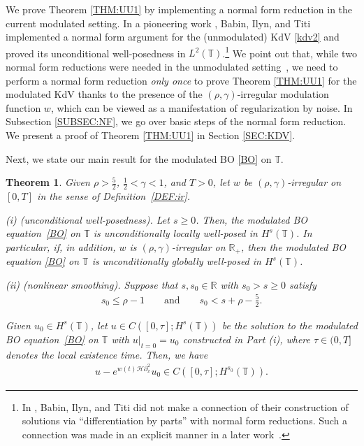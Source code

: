 \documentclass[letterpaper, 11pt,  reqno]{amsart}
\newtheorem{theorem}{Theorem} [section]
\newcommand{\1}{\hspace{0.5mm}\text{I}\hspace{0.5mm}}
\newcommand{\noi}{\noindent}
\newcommand{\R}{\mathbb{R}}
\newcommand{\T}{\mathbb{T}}
\renewcommand{\H}{\mathcal{H}}
\newcommand{\g}{\gamma}
\newcommand{\dx}{\partial_x}
\numberwithin{equation}{section}
\numberwithin{theorem}{section}
\begin{document}
We prove Theorem \ref{THM:UU1}
by implementing a normal form reduction
in the current modulated setting.
In a pioneering work \cite{BIT}, 
Babin, Ilyn, and Titi
implemented  a normal form argument
for the (unmodulated) KdV \eqref{kdv2}
and proved  its unconditional well-posedness 
in $L^2(\T)$.\footnote{In \cite{BIT}, 
Babin, Ilyn, and Titi did not make a connection
of their construction of solutions via ``differentiation by parts''
with 
normal form reductions.
Such a connection was made in an explicit manner
in a later work~\cite{GKO}.}
We point out that, while 
two normal form reductions
were needed in the unmodulated setting~\cite{BIT}, 
we  need to perform a normal form reduction
{\it only once} to prove Theorem \ref{THM:UU1}
for the modulated KdV
thanks to  the presence of the $(\rho, \g)$-irregular modulation function $w$,
which can be viewed as a manifestation
of regularization by noise.
In Subsection \ref{SUBSEC:NF}, we go over basic steps of
the normal form reduction.
We present a proof of Theorem \ref{THM:UU1}
in Section \ref{SEC:KDV}.




\medskip


Next, we state our main  result 
for the modulated BO \eqref{BO} on $\T$.




\begin{theorem}\label{THM:UU2}
Given $\rho > \frac 52$,  $\frac12< \g < 1$, and $T> 0$, 
let  $w$ be $(\rho,\g)$-irregular on $[0, T]$ in the sense of Definition~\ref{DEF:ir}.


\smallskip

\noi
\textup{(i) (unconditional well-posedness).} 
Let   $s\ge 0$.
Then, the modulated BO equation~\eqref{BO}
on  $\T$
is unconditionally locally well-posed in $H^s(\T)$.
In particular, 
if, in addition, $w$ is  $(\rho,\g)$-irregular  on $\R_+$, 
then the modulated BO equation \eqref{BO}
on  $\T$
is unconditionally globally well-posed in $H^s(\T)$.

\smallskip

\noi
\textup{(ii) (nonlinear smoothing).} 
Suppose that 
$s, s_0 \in \R$ with 
$s_0 > s\ge 0$   satisfy
\begin{align*}
s_0 \le  \rho - 1
\qquad \text{and}\qquad 
s_0 < s + \rho - \frac 52.
\end{align*}



\noi
Given $u_0 \in H^s(\T)$, 
let $u
\in C([0, \tau]; H^s(\T))$ be the  solution 
to the modulated BO equation~\eqref{BO}
on $\T$
with $u|_{t = 0} = u_0$
constructed in Part (i), 
where 
$\tau \in (0,  T]$ denotes the local existence time.
Then, we have 
\begin{align*}
 u - e^{w(t) \H\dx^2}u_0 \in C([0, \tau]; H^{s_0}(\T)).
\end{align*}



\end{theorem}
\end{document}
